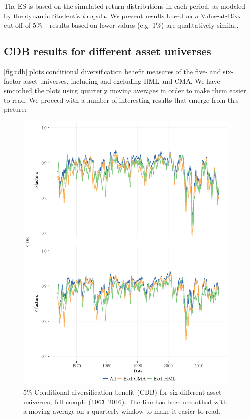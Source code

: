 The ES is based on the simulated return distributions in each period, as modeled by the dynamic Student's \textit{t} copula. We present results based on a Value-at-Risk cut-off of 5\% -- results based on lower values (e.g. 1\%) are qualitatively similar.

\subsection{CDB results for different asset universes}
\autoref{fig:cdb} plots conditional diversification benefit measures of the five- and six-factor asset universes, including and excluding HML and CMA. We have smoothed the plots using quarterly moving averages in order to make them easier to read. We proceed with a number of interesting results that emerge from this picture:

\begin{figure}
  \centering
  \footnotesize
  \renewcommand{\arraystretch}{1.2}
  \caption{5\% Conditional diversification benefit (CDB) for six different asset universes, full sample (1963--2016). 
  The line has been smoothed with a moving average on a quarterly window to make it easier to read.}
  \label{fig:cdb}
  \includegraphics[scale = 1]{graphics/cdb_5F_6F.png}
\end{figure}

